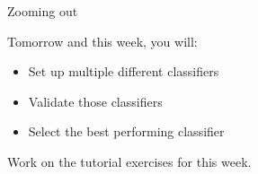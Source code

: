 \documentclass[compress]{beamer}
\begin{document}
\begin{frame}[fragile]{Zooming out} 
	
\begin{alertblock}{Tomorrow and this week, you will:}
\begin{itemize}
	\item Set up multiple different classifiers
	\item Validate those classifiers
	\item Select the best performing classifier
\end{itemize}
\end{alertblock}
	
Work on the tutorial exercises for this week. \\\
\end{frame}
\end{document}
